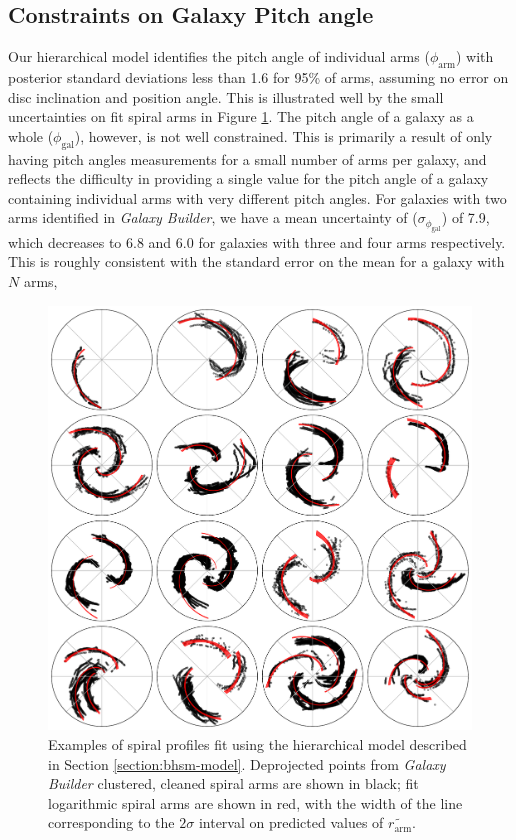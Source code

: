 \subsection{Constraints on Galaxy Pitch angle}
\label{section:constraints-on-galaxy-phi}
Our hierarchical model identifies the pitch angle of individual arms ($\phi_\mathrm{arm}$) with posterior standard deviations less than {1.6\degree} for 95\% of arms, assuming no error on disc inclination and position angle. This is illustrated well by the small uncertainties on fit spiral arms in Figure \ref{fig:example-spiral-fits}. The pitch angle of a galaxy as a whole ($\phi_\mathrm{gal}$), however, is not well constrained. This is primarily a result of only having pitch angles measurements for a small number of arms per galaxy, and reflects the difficulty in providing a single value for the pitch angle of a galaxy containing individual arms with very different pitch angles. For galaxies with two arms identified in \textit{Galaxy Builder}, we have a mean uncertainty of ($\sigma_{\phi_\mathrm{gal}}$) of  {7.9\degree}, which decreases to {6.8\degree} and {6.0\degree} for galaxies with three and four arms respectively. This is roughly consistent with the standard error on the mean for a galaxy with $N$ arms,

\begin{figure}
  \includegraphics[width=17.7cm]{plots/example-spiral-fits.pdf}
  \caption{Examples of spiral profiles fit using the hierarchical model described in Section \ref{section:bhsm-model}. Deprojected points from \textit{Galaxy Builder} clustered, cleaned spiral arms are shown in black; fit logarithmic spiral arms are shown in red, with the width of the line corresponding to the $2\sigma$ interval on predicted values of $\widetilde{r_\mathrm{arm}}$.}
  \label{fig:example-spiral-fits}
\end{figure}


